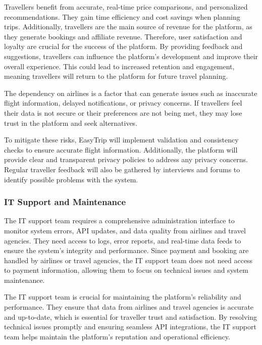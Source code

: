 Travellers benefit from accurate, real-time price comparisons, and personalized recommendations. They gain time efficiency and cost savings when planning trips. Additionally, travellers are the main source of revenue for the platform, as they generate bookings and affiliate revenue. Therefore, user satisfaction and loyalty are crucial for the success of the platform. By providing feedback and suggestions, travellers can influence the platform's development and improve their overall experience. This could lead to increased retention and engagement, meaning travellers will return to the platform for future travel planning.

The dependency on airlines is a factor that can generate issues such as inaccurate flight information, delayed notifications, or privacy concerns. If travellers feel their data is not secure or their preferences are not being met, they may lose trust in the platform and seek alternatives.

To mitigate these risks, EasyTrip will implement validation and consistency checks to ensure accurate flight information. Additionally, the platform will provide clear and transparent privacy policies to address any privacy concerns. Regular traveller feedback will also be gathered by interviews and forums to identify possible problems with the system. 

\subsubsection{IT Support and Maintenance}
The IT support team requires a comprehensive administration interface to monitor system errors, API updates, and data quality from airlines and travel agencies. They need access to logs, error reports, and real-time data feeds to ensure the system's integrity and performance. Since payment and booking are handled by airlines or travel agencies, the IT support team does not need access to payment information, allowing them to focus on technical issues and system maintenance.

The IT support team is crucial for maintaining the platform's reliability and performance. They ensure that data from airlines and travel agencies is accurate and up-to-date, which is essential for traveller trust and satisfaction. By resolving technical issues promptly and ensuring seamless API integrations, the IT support team helps maintain the platform's reputation and operational efficiency.

